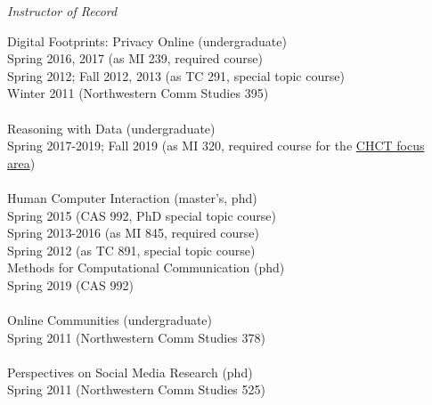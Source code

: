 \documentclass[9pt]{extarticle}
\begin{document}
\emph{Instructor of Record} \\
\vspace{1pt}
\begin{tabbing}
Digital Footprints: Privacy Online (undergraduate) \\ 
\hspace{0.5cm} Spring 2016, 2017 (as MI 239, required course) \\
\hspace{0.5cm} Spring 2012; Fall 2012, 2013 (as TC 291, special topic course) \\ 
\hspace{0.5cm} Winter 2011 (Northwestern Comm Studies 395) \\\\

Reasoning with Data (undergraduate) \\
\hspace{0.5cm} Spring 2017-2019; Fall 2019 (as MI 320, required course for the \href{http://mi.msu.edu/undergraduate-studies/majors/}{CHCT focus area}) \\\\

Human Computer Interaction (master's, phd) \\
\hspace{0.5cm} Spring 2015 (CAS 992, PhD special topic course) \\
\hspace{0.5cm} Spring 2013-2016 (as MI 845, required course) \\
\hspace{0.5cm} Spring 2012 (as TC 891, special topic course) \\

Methods for Computational Communication (phd) \\
\hspace{0.5cm} Spring 2019 (CAS 992) \\\\

Online Communities (undergraduate) \\
\hspace{0.5cm} Spring 2011 (Northwestern Comm Studies 378) \\\\

Perspectives on Social Media Research (phd)\\
\hspace{0.5cm} Spring 2011 (Northwestern Comm Studies 525) \\\\


\end{tabbing}
\end{document}
